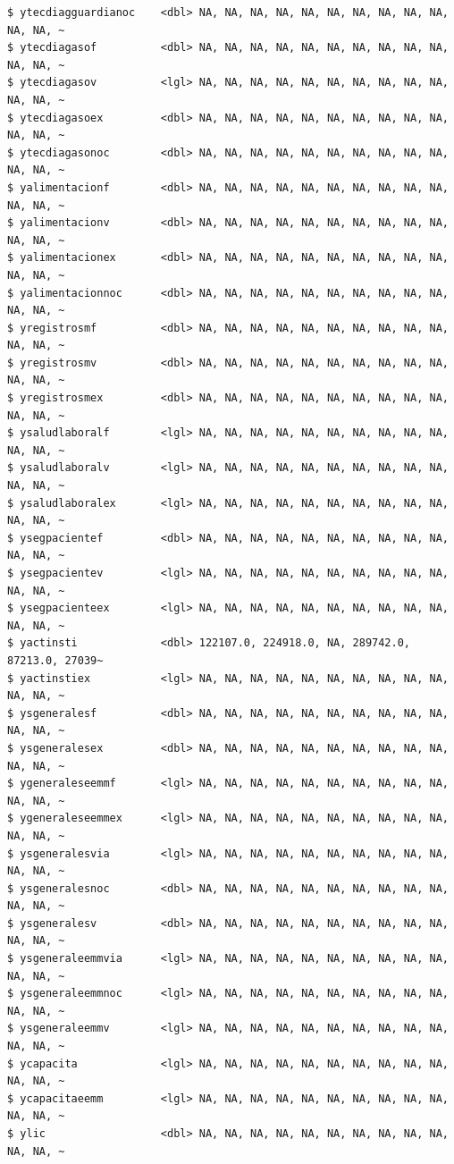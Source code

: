 \documentclass[
  letterpaper,
  DIV=11,
  numbers=noendperiod]{scrreprt}
\begin{document}
\begin{verbatim}
$ ytecdiagguardianoc    <dbl> NA, NA, NA, NA, NA, NA, NA, NA, NA, NA, NA, NA, ~
$ ytecdiagasof          <dbl> NA, NA, NA, NA, NA, NA, NA, NA, NA, NA, NA, NA, ~
$ ytecdiagasov          <lgl> NA, NA, NA, NA, NA, NA, NA, NA, NA, NA, NA, NA, ~
$ ytecdiagasoex         <dbl> NA, NA, NA, NA, NA, NA, NA, NA, NA, NA, NA, NA, ~
$ ytecdiagasonoc        <dbl> NA, NA, NA, NA, NA, NA, NA, NA, NA, NA, NA, NA, ~
$ yalimentacionf        <dbl> NA, NA, NA, NA, NA, NA, NA, NA, NA, NA, NA, NA, ~
$ yalimentacionv        <dbl> NA, NA, NA, NA, NA, NA, NA, NA, NA, NA, NA, NA, ~
$ yalimentacionex       <dbl> NA, NA, NA, NA, NA, NA, NA, NA, NA, NA, NA, NA, ~
$ yalimentacionnoc      <dbl> NA, NA, NA, NA, NA, NA, NA, NA, NA, NA, NA, NA, ~
$ yregistrosmf          <dbl> NA, NA, NA, NA, NA, NA, NA, NA, NA, NA, NA, NA, ~
$ yregistrosmv          <dbl> NA, NA, NA, NA, NA, NA, NA, NA, NA, NA, NA, NA, ~
$ yregistrosmex         <dbl> NA, NA, NA, NA, NA, NA, NA, NA, NA, NA, NA, NA, ~
$ ysaludlaboralf        <lgl> NA, NA, NA, NA, NA, NA, NA, NA, NA, NA, NA, NA, ~
$ ysaludlaboralv        <lgl> NA, NA, NA, NA, NA, NA, NA, NA, NA, NA, NA, NA, ~
$ ysaludlaboralex       <lgl> NA, NA, NA, NA, NA, NA, NA, NA, NA, NA, NA, NA, ~
$ ysegpacientef         <dbl> NA, NA, NA, NA, NA, NA, NA, NA, NA, NA, NA, NA, ~
$ ysegpacientev         <lgl> NA, NA, NA, NA, NA, NA, NA, NA, NA, NA, NA, NA, ~
$ ysegpacienteex        <lgl> NA, NA, NA, NA, NA, NA, NA, NA, NA, NA, NA, NA, ~
$ yactinsti             <dbl> 122107.0, 224918.0, NA, 289742.0, 87213.0, 27039~
$ yactinstiex           <lgl> NA, NA, NA, NA, NA, NA, NA, NA, NA, NA, NA, NA, ~
$ ysgeneralesf          <dbl> NA, NA, NA, NA, NA, NA, NA, NA, NA, NA, NA, NA, ~
$ ysgeneralesex         <dbl> NA, NA, NA, NA, NA, NA, NA, NA, NA, NA, NA, NA, ~
$ ygeneraleseemmf       <lgl> NA, NA, NA, NA, NA, NA, NA, NA, NA, NA, NA, NA, ~
$ ygeneraleseemmex      <lgl> NA, NA, NA, NA, NA, NA, NA, NA, NA, NA, NA, NA, ~
$ ysgeneralesvia        <lgl> NA, NA, NA, NA, NA, NA, NA, NA, NA, NA, NA, NA, ~
$ ysgeneralesnoc        <dbl> NA, NA, NA, NA, NA, NA, NA, NA, NA, NA, NA, NA, ~
$ ysgeneralesv          <dbl> NA, NA, NA, NA, NA, NA, NA, NA, NA, NA, NA, NA, ~
$ ysgeneraleemmvia      <lgl> NA, NA, NA, NA, NA, NA, NA, NA, NA, NA, NA, NA, ~
$ ysgeneraleemmnoc      <lgl> NA, NA, NA, NA, NA, NA, NA, NA, NA, NA, NA, NA, ~
$ ysgeneraleemmv        <lgl> NA, NA, NA, NA, NA, NA, NA, NA, NA, NA, NA, NA, ~
$ ycapacita             <lgl> NA, NA, NA, NA, NA, NA, NA, NA, NA, NA, NA, NA, ~
$ ycapacitaeemm         <lgl> NA, NA, NA, NA, NA, NA, NA, NA, NA, NA, NA, NA, ~
$ ylic                  <dbl> NA, NA, NA, NA, NA, NA, NA, NA, NA, NA, NA, NA, ~

\end{verbatim}
\end{document}

